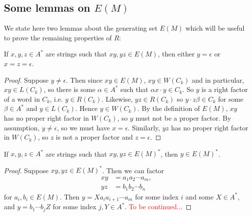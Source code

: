 \documentclass[11pt,libertine,widepage,nosubthm]{lmaths}
\begin{document}

\subsection{Some lemmas on $E(M)$}

We state here two lemmas about the generating set $E(M)$ which will be useful to prove the remaining properties of $R$:

\begin{lemma} \label{lma:no-middle-E(M)}
	If $x, y, z \in A^*$ are strings such that $xy, yz \in E(M)$, then either $y = \epsilon$ or $x = z = \epsilon$.
\end{lemma}
\begin{proof}
	Suppose $y \ne \epsilon$. Then since $xy \in E(M)$, $xy \in W(C_k)$ and in particular, $xy \in L(C_k)$, so there is some $\alpha \in A^*$ such that $\alpha x \cdot y \in C_k$. So $y$ is a right factor of a word in $C_k$, i.e. $y \in R(C_k)$. Likewise, $yz \in R(C_k)$ so $y \cdot z\beta \in C_k$ for some $\beta \in A^*$ and $y \in L(C_k)$. Hence $y \in W(C_k)$. By the definition of $E(M)$, $xy$ has no proper right factor in $W(C_k)$, so $y$ must not be a proper factor. By assumption, $y \ne \epsilon$, so we must have $x = \epsilon$. Similarly, $yz$ has no proper right factor in $W(C_k)$, so $z$ is not a proper factor and $z = \epsilon$.
\end{proof}

\begin{cly} \label{cly:middle-E(M)*}
	If $x, y, z \in A^*$ are strings such that $xy, yz \in E(M)^*$, then $y \in E(M)^*$.
\end{cly}
\begin{proof}
	Suppose $xy, yz \in E(M)^*$. Then we can factor
		\begin{align*}
			xy &= a_1 a_2 \cdots a_m, \\
			yz &= b_1 b_2 \cdots b_n
		\end{align*}
	for $a_i, b_i \in E(M)$. Then $y = X a_i a_{i+1} \cdots a_m$ for some index $i$ and some $X \in A^*$, and $y = b_1 \cdots b_j Z$ for some index $j, Y \in A^*$. \textcolor{red}{To be continued...}
\end{proof}
\end{document}
